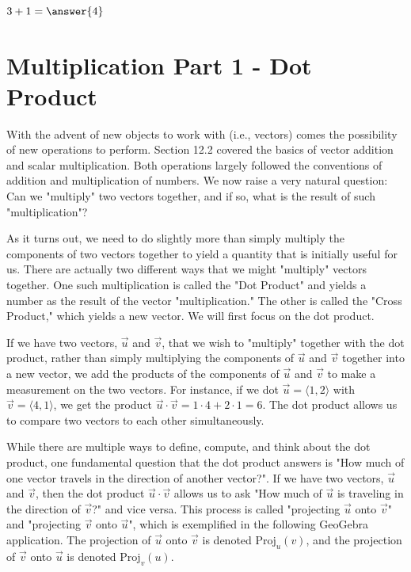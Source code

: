 \documentclass{ximera}
\begin{document}
\begin{exercise}
    $3+1=\answer{4}$
\end{exercise}

\begin{multipleChoice}
\end{multipleChoice}

\section{Multiplication Part 1 - Dot Product}

With the advent of new objects to work with (i.e., vectors) comes the possibility of new operations to perform. Section 12.2 covered the basics of vector addition and scalar multiplication. Both operations largely followed the conventions of addition and multiplication of numbers. We now raise a very natural question: Can we "multiply" two vectors together, and if so, what is the result of such "multiplication"?

As it turns out, we need to do slightly more than simply multiply the components of two vectors together to yield a quantity that is initially useful for us. There are actually two different ways that we might "multiply" vectors together. One such multiplication is called the "Dot Product" and yields a number as the result of the vector "multiplication." The other is called the "Cross Product," which yields a new vector. We will first focus on the dot product.

If we have two vectors, $\vec u$ and $\vec v$, that we wish to "multiply" together with the dot product, rather than simply multiplying the components of $\vec u$ and $\vec v$ together into a new vector, we add the products of the components of $\vec u$ and $\vec v$ to make a measurement on the two vectors. For instance, if we dot $\vec u=\langle 1,2\rangle$ with $\vec v=\langle 4,1\rangle$, we get the product $\vec u\cdot\vec v=1\cdot 4+2\cdot 1=6$. The dot product allows us to compare two vectors to each other simultaneously.

While there are multiple ways to define, compute, and think about the dot product, one fundamental question that the dot product answers is "How much of one vector travels in the direction of another vector?". If we have two vectors, $\vec u$ and $\vec v$, then the dot product $\vec u\cdot\vec v$ allows us to ask "How much of $\vec u$ is traveling in the direction of $\vec v$?" and vice versa. This process is called "projecting $\vec u$ onto $\vec v$" and "projecting $\vec v$ onto $\vec u$", which is exemplified in the following GeoGebra application. The projection of $\vec u$ onto $\vec v$ is denoted $\text{Proj}_u(v)$, and the projection of $\vec v$ onto $\vec u$ is denoted $\text{Proj}_v(u)$.
\end{document}
